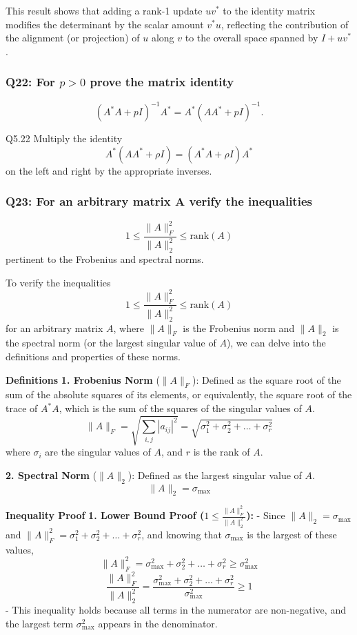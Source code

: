 \documentclass[8pt]{article}
\begin{document}
This result shows that adding a rank-1 update \( uv^* \) to the identity matrix modifies the determinant by the scalar amount \( v^*u \), reflecting the contribution of the alignment (or projection) of \( u \) along \( v \) to the overall space spanned by \( I + uv^* \).



\subsubsection*{Q22: For \(p > 0\) prove the matrix identity}
\[
(A^*A + pI)^{-1} A^* = A^*(AA^* + pI)^{-1}.
\]

Q5.22 Multiply the identity
\[
A^*(AA^* + \rho I) = (A^*A + \rho I)A^*
\]
on the left and right by the appropriate inverses.

\subsubsection*{Q23: For an arbitrary matrix A verify the inequalities}
\[
1 \leq \frac{\|A\|_F^2}{\|A\|_2^2} \leq \text{rank}(A)
\]
pertinent to the Frobenius and spectral norms.

To verify the inequalities 
\[
1 \leq \frac{\|A\|_F^2}{\|A\|_2^2} \leq \text{rank}(A)
\]
for an arbitrary matrix \( A \), where \( \|A\|_F \) is the Frobenius norm and \( \|A\|_2 \) is the spectral norm (or the largest singular value of \( A \)), we can delve into the definitions and properties of these norms.

\textbf{Definitions}
\textbf{1. Frobenius Norm} (\( \|A\|_F \)): Defined as the square root of the sum of the absolute squares of its elements, or equivalently, the square root of the trace of \( A^*A \), which is the sum of the squares of the singular values of \( A \).
   \[
   \|A\|_F = \sqrt{\sum_{i,j} |a_{ij}|^2} = \sqrt{\sigma_1^2 + \sigma_2^2 + \ldots + \sigma_r^2}
   \]
   where \( \sigma_i \) are the singular values of \( A \), and \( r \) is the rank of \( A \).

\textbf{2. Spectral Norm} (\( \|A\|_2 \)): Defined as the largest singular value of \( A \).
   \[
   \|A\|_2 = \sigma_{\text{max}}
   \]

\textbf{Inequality Proof}
\textbf{1. Lower Bound Proof (\(1 \leq \frac{\|A\|_F^2}{\|A\|_2^2}\)):}
   - Since \( \|A\|_2 = \sigma_{\text{max}} \) and \( \|A\|_F^2 = \sigma_1^2 + \sigma_2^2 + \ldots + \sigma_r^2 \), and knowing that \( \sigma_{\text{max}} \) is the largest of these values,
   \[
   \|A\|_F^2 = \sigma_{\text{max}}^2 + \sigma_2^2 + \ldots + \sigma_r^2 \geq \sigma_{\text{max}}^2
   \]
   \[
   \frac{\|A\|_F^2}{\|A\|_2^2} = \frac{\sigma_{\text{max}}^2 + \sigma_2^2 + \ldots + \sigma_r^2}{\sigma_{\text{max}}^2} \geq 1
   \]
   - This inequality holds because all terms in the numerator are non-negative, and the largest term \( \sigma_{\text{max}}^2 \) appears in the denominator.
\end{document}
